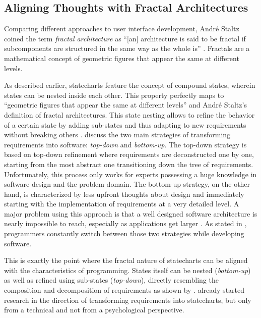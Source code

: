 \subsection{Aligning Thoughts with Fractal Architectures}
\label{sub:aligning-thoughts-with-fractal-architectures}
Comparing different approaches to user interface development, André Staltz coined the term \emph{fractal architecture} as ``[an] architecture is said to be fractal if subcomponents are structured in the same way as the whole is'' \autocite{staltz_unidirectional_2015}.
Fractals are a mathematical concept of geometric figures that appear the same at different levels.

As described earlier, statecharts feature the concept of compound states, wherein states can be nested inside each other.
This property perfectly maps to ``geometric figures that appear the same at different levels'' and André Staltz's definition of fractal architectures.
This state nesting allows to refine the behavior of a certain state by adding sub-states and thus adapting to new requirements without breaking others \autocite{harel_statecharts:_1987}.
\textcite{leveson_experiences_1991} discuss the two main strategies of transforming requirements into software: \emph{top-down} and \emph{bottom-up}.
The top-down strategy is based on top-down refinement where requirements are deconstructed one by one, starting from the most abstract one transitioning down the tree of requirements.
Unfortunately, this process only works for experts possessing a huge knowledge in software design and the problem domain.
The bottom-up strategy, on the other hand, is characterized by less upfront thoughts about design and immediately starting with the implementation of requirements at a very detailed level.
A major problem using this approach is that a well designed software architecture is nearly impossible to reach, especially as applications get larger \autocite{horrocks_constructing_1999}.
As stated in \textcite{leveson_experiences_1991}, programmers constantly switch between those two strategies while developing software.

This is exactly the point where the fractal nature of statecharts can be aligned with the characteristics of programming.
States itself can be nested (\emph{bottom-up}) as well as refined using sub-states (\emph{top-down}), directly resembling the composition and decomposition of requirements as shown by \textcite{leveson_experiences_1991}.
\textcite{glinz_statecharts_2002} already started research in the direction of transforming requirements into statecharts, but only from a technical and not from a psychological perspective.


